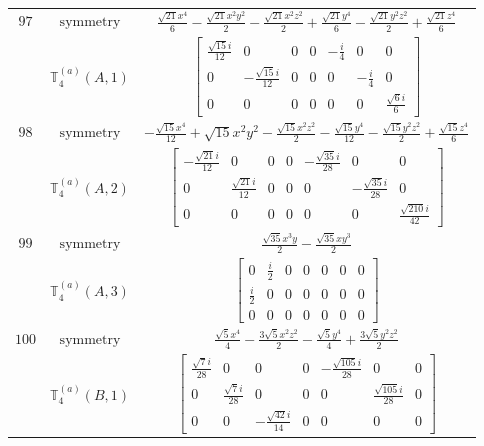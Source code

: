\documentclass[fleqn,8pt,landscape]{jsarticle}
\begin{document}
\begin{longtable}{ccc}
$ 97 $ & $ \text{symmetry} $ & $ \frac{\sqrt{21} x^{4}}{6} - \frac{\sqrt{21} x^{2} y^{2}}{2} - \frac{\sqrt{21} x^{2} z^{2}}{2} + \frac{\sqrt{21} y^{4}}{6} - \frac{\sqrt{21} y^{2} z^{2}}{2} + \frac{\sqrt{21} z^{4}}{6} $ \\
$  $ & $ \mathbb{T}_{4}^{(a)}(A,1) $ & $ \begin{bmatrix} \frac{\sqrt{15} i}{12} & 0 & 0 & 0 & - \frac{i}{4} & 0 & 0 \\ 0 & - \frac{\sqrt{15} i}{12} & 0 & 0 & 0 & - \frac{i}{4} & 0 \\ 0 & 0 & 0 & 0 & 0 & 0 & \frac{\sqrt{6} i}{6} \end{bmatrix} $ \\ \hline
$ 98 $ & $ \text{symmetry} $ & $ - \frac{\sqrt{15} x^{4}}{12} + \sqrt{15} x^{2} y^{2} - \frac{\sqrt{15} x^{2} z^{2}}{2} - \frac{\sqrt{15} y^{4}}{12} - \frac{\sqrt{15} y^{2} z^{2}}{2} + \frac{\sqrt{15} z^{4}}{6} $ \\
$  $ & $ \mathbb{T}_{4}^{(a)}(A,2) $ & $ \begin{bmatrix} - \frac{\sqrt{21} i}{12} & 0 & 0 & 0 & - \frac{\sqrt{35} i}{28} & 0 & 0 \\ 0 & \frac{\sqrt{21} i}{12} & 0 & 0 & 0 & - \frac{\sqrt{35} i}{28} & 0 \\ 0 & 0 & 0 & 0 & 0 & 0 & \frac{\sqrt{210} i}{42} \end{bmatrix} $ \\ \hline
$ 99 $ & $ \text{symmetry} $ & $ \frac{\sqrt{35} x^{3} y}{2} - \frac{\sqrt{35} x y^{3}}{2} $ \\
$  $ & $ \mathbb{T}_{4}^{(a)}(A,3) $ & $ \begin{bmatrix} 0 & \frac{i}{2} & 0 & 0 & 0 & 0 & 0 \\ \frac{i}{2} & 0 & 0 & 0 & 0 & 0 & 0 \\ 0 & 0 & 0 & 0 & 0 & 0 & 0 \end{bmatrix} $ \\ \hline
$ 100 $ & $ \text{symmetry} $ & $ \frac{\sqrt{5} x^{4}}{4} - \frac{3 \sqrt{5} x^{2} z^{2}}{2} - \frac{\sqrt{5} y^{4}}{4} + \frac{3 \sqrt{5} y^{2} z^{2}}{2} $ \\
$  $ & $ \mathbb{T}_{4}^{(a)}(B,1) $ & $ \begin{bmatrix} \frac{\sqrt{7} i}{28} & 0 & 0 & 0 & - \frac{\sqrt{105} i}{28} & 0 & 0 \\ 0 & \frac{\sqrt{7} i}{28} & 0 & 0 & 0 & \frac{\sqrt{105} i}{28} & 0 \\ 0 & 0 & - \frac{\sqrt{42} i}{14} & 0 & 0 & 0 & 0 \end{bmatrix} $ \\ \hline

\end{longtable}
\end{document}
